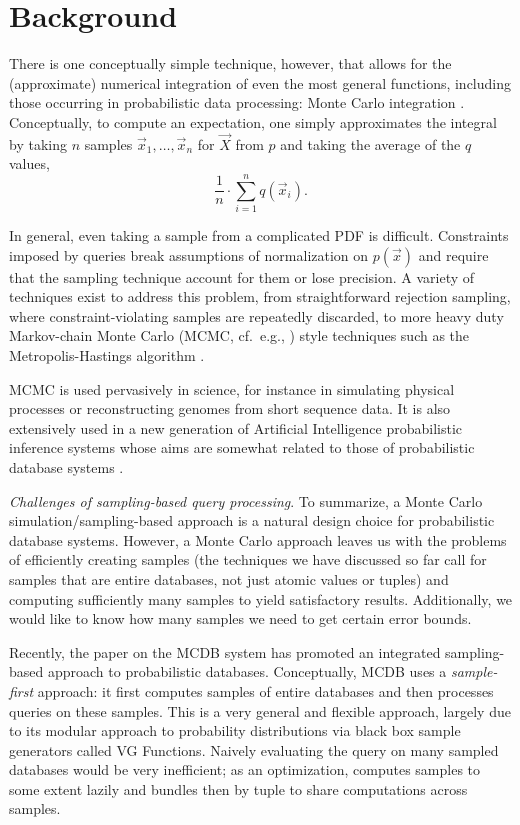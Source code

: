 \section{Background}
There is one conceptually simple technique, however, that  allows for the (approximate) numerical integration of even  the most general  functions, including those occurring in  probabilistic data  processing: Monte Carlo integration \cite{montecarlo}. Conceptually, to compute an expectation, one simply approximates   the  integral  by  taking $n$ samples $\vec{x}_1, \dots, \vec{x}_n$ for $\vec{X}$ from $p$  and  taking  the  average of the $q$ values,
%
\begin{equation}\label{eq:mc_expectation}
\frac{1}{n} \cdot \sum_{i=1}^n q(\vec{x}_i).
\end{equation}

In general, even taking a sample from a complicated PDF is difficult.  Constraints imposed by queries break assumptions of normalization on $p(\vec x)$ and require that the sampling technique account for them or lose precision.  A variety of techniques exist to address this problem, from straightforward rejection sampling, where constraint-violating samples are repeatedly discarded, to more heavy duty Markov-chain Monte Carlo (MCMC, cf.\ e.g., \cite{GRS1995}) style techniques such as the Metropolis-Hastings algorithm \cite{metropolis,GRS1995}. 

MCMC is used pervasively in science, for instance in simulating  physical processes  or reconstructing  genomes  from short sequence data.  It is also extensively used in a new generation of Artificial Intelligence probabilistic inference systems whose aims are somewhat related to those of probabilistic database systems \cite{RD2006, BLOG}.

{\em Challenges  of sampling-based query processing}\/.  To  summarize, a Monte Carlo simulation/sampling-based approach is  a  natural  design  choice  for  probabilistic  database  systems. However,  a  Monte Carlo  approach  leaves  us  with the  problems  of efficiently creating samples (the  techniques we have discussed so far call for samples that are  entire databases, not just atomic values or tuples) and computing sufficiently  many samples to yield satisfactory results.  Additionally, we would like to know how many samples we need to get certain error bounds.


Recently,  the paper  \cite{MCDB} on  the MCDB  system  has promoted an integrated  sampling-based  approach to  probabilistic databases.  Conceptually,  MCDB uses a {\em sample-first}\/ approach: it   first  computes  samples  of  entire databases and then processes queries  on these samples.  This is a very general and flexible approach, largely due to its modular approach to probability distributions via black box sample generators called VG Functions.  Naively evaluating the query on many sampled databases would be very inefficient; as an optimization, computes samples to some extent lazily and bundles then by tuple to share computations across samples.  

